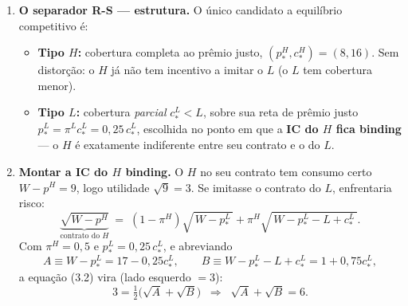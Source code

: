 \documentclass[11pt,a4paper]{article}
\newcommand{\dc}[2]{#1{,}#2}
\begin{document}
\begin{enumerate}[leftmargin=2em,itemsep=4pt]
\begin{empalavras}
\smallskip\noindent
\textbf{Single-crossing} (``cruzamento único'') é a propriedade que garante isso. Pense em
quanto cada tipo valoriza ``um pedacinho a mais de cobertura''. O alto risco ($H$) bate o
carro com mais frequência, então uma cobertura extra é mais útil para ele — ele paga
\emph{mais caro} por ela do que o baixo risco. Tecnicamente: as curvas de indiferença (linhas
de ``mesma satisfação'') dos dois tipos, desenhadas no plano prêmio~$\times$~cobertura, se
cruzam \textbf{exatamente uma vez}. Esse cruzamento único é o que permite desenhar um
contrato que o $L$ aceita mas o $H$ recusa — a base de toda a separação. Sem single-crossing,
os gostos se embaralhariam e não daria para separar.
\end{empalavras}

\item \textbf{O separador R-S — estrutura.} O único candidato a equilíbrio competitivo é:
\begin{itemize}[leftmargin=1.4em,itemsep=2pt]
\item \textbf{Tipo $H$:} cobertura completa ao prêmio justo, $(p^H_\ast, c^H_\ast) = (8,16)$.
Sem distorção: o $H$ já não tem incentivo a imitar o $L$ (o $L$ tem cobertura menor).
\item \textbf{Tipo $L$:} cobertura \emph{parcial} $c^L_\ast < L$, sobre sua reta de prêmio
justo $p^L_\ast = \pi^L c^L_\ast = \dc{0}{25}\,c^L_\ast$, escolhida no ponto em que a
\textbf{IC do $H$ fica binding} — o $H$ é exatamente indiferente entre seu contrato e o do $L$.
\end{itemize}

\item \textbf{Montar a IC do $H$ binding.} O $H$ no seu contrato tem consumo certo
$W-p^H = 9$, logo utilidade $\sqrt{9}=3$. Se imitasse o contrato do $L$, enfrentaria risco:
\[
\underbrace{\sqrt{W - p^H}}_{\text{contrato do }H}
\;=\;
(1-\pi^H)\sqrt{\,W - p^L_\ast\,} + \pi^H \sqrt{\,W - p^L_\ast - L + c^L_\ast\,}.
\tag{3.2}
\]
Com $\pi^H=\dc{0}{5}$ e $p^L_\ast = \dc{0}{25}\,c^L_\ast$, e abreviando
\[
A \equiv W - p^L_\ast = 17 - \dc{0}{25}c^L_\ast, \qquad
B \equiv W - p^L_\ast - L + c^L_\ast = 1 + \dc{0}{75}c^L_\ast,
\]
a equação (3.2) vira (lado esquerdo $=3$):
\[
3 = \tfrac12\big(\sqrt{A} + \sqrt{B}\big)
\;\;\Longrightarrow\;\; \sqrt{A} + \sqrt{B} = 6. \tag{3.3}
\]


\end{enumerate}
\end{document}
